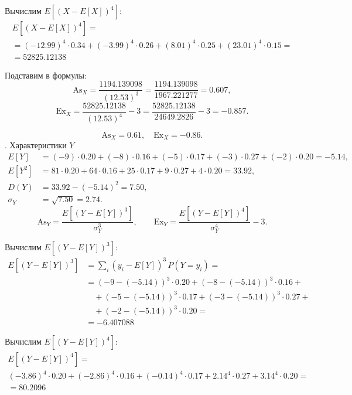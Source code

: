\documentclass[a4paper,14pt]{extarticle}
\begin{document}
        Вычислим $E[(X - E[X])^4]$:
        \begin{gather*}
        E[(X - E[X])^4] = \\
        = (-12.99)^4 \cdot 0.34 + (-3.99)^4 \cdot 0.26 + (8.01)^4 \cdot 0.25 + (23.01)^4 \cdot 0.15 = \\
        = 52825.12138
        \end{gather*}

        Подставим в формулы:
        \[
        \mathrm{As}_X = \frac{1194.139098}{(12.53)^3} = \frac{1194.139098}{1967.221277} = 0.607,
        \]
        \[
        \mathrm{Ex}_X = \frac{52825.12138}{(12.53)^4} - 3 = \frac{52825.12138}{24649.2826} - 3 = -0.857.
        \]

        \[
        \boxed{\mathrm{As}_X = 0.61, \quad \mathrm{Ex}_X = -0.86.}
        \]
        . Характеристики $Y$
        \[
        \begin{aligned}
        E[Y] &= (-9)\cdot0.20 + (-8)\cdot0.16 + (-5)\cdot0.17 + (-3)\cdot0.27 + (-2)\cdot0.20 = -5.14,\\
        E[Y^2] &= 81\cdot0.20 + 64\cdot0.16 + 25\cdot0.17 + 9\cdot0.27 + 4\cdot0.20 = 33.92,\\
        D(Y) &= 33.92 - (-5.14)^2 = 7.50,\\
        \sigma_Y &= \sqrt{7.50} = 2.74.
        \end{aligned}
        \]
        \[
        \mathrm{As}_Y = \frac{E[(Y - E[Y])^3]}{\sigma_Y^3}, 
        \qquad
        \mathrm{Ex}_Y = \frac{E[(Y - E[Y])^4]}{\sigma_Y^4} - 3.
        \]

        Вычислим $E[(Y - E[Y])^3]$:
        \[
        \begin{aligned}
        E[(Y - E[Y])^3] &= \sum_i (y_i - E[Y])^3 \, P(Y=y_i) = \\
        &= (-9 - (-5.14))^3 \cdot 0.20 + (-8 - (-5.14))^3 \cdot 0.16 + \\
        &\quad + (-5 - (-5.14))^3 \cdot 0.17 + (-3 - (-5.14))^3 \cdot 0.27 + \\
        &\quad + (-2 - (-5.14))^3 \cdot 0.20 = \\
        & = -6.407088
        \end{aligned}
        \]

        Вычислим $E[(Y - E[Y])^4]$:
        \begin{gather*}
        E[(Y - E[Y])^4] = \\
        (-3.86)^4 \cdot 0.20 + (-2.86)^4 \cdot 0.16 + (-0.14)^4 \cdot 0.17 + 2.14^4 \cdot 0.27 + 3.14^4 \cdot 0.20 = \\
        = 80.2096
        \end{gather*}
\end{document}
